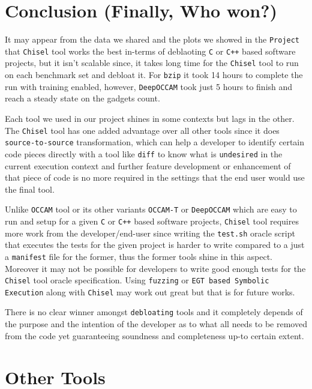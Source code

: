 \documentclass{relatorio}
\begin{document}
\section{Conclusion (Finally, Who won?)}%
\label{Tools}

It may appear from the data we shared and the plots we showed in the \texttt{Project} that \texttt{Chisel} tool works the best in-terms of deblaoting \texttt{C} or \texttt{C++} based software projects, but it isn't scalable since, it takes long time for the \texttt{Chisel} tool to run on each benchmark set and debloat it. For \texttt{bzip} it took 14 hours to complete the run with training enabled, however, \texttt{DeepOCCAM} took just 5 hours to finish and reach a steady state on the gadgets count.

Each tool we used in our project shines in some contexts but lags in the other. The \texttt{Chisel} tool has one added advantage over all other tools since it does \texttt{source-to-source} transformation, which can help a developer to identify certain code pieces directly with a tool like \texttt{diff} to know what is \texttt{undesired} in the current execution context and further feature development or enhancement of that piece of code is no more required in the settings that the end user would use the final tool.

Unlike \texttt{OCCAM} tool or its other variants \texttt{OCCAM-T} or \texttt{DeepOCCAM} which are easy to run and setup for a given \texttt{C} or \texttt{C++} based software projects, \texttt{Chisel} tool requires more work from the developer/end-user since writing the \texttt{test.sh} oracle script that executes the tests for the given project is harder to write compared to a just a \texttt{manifest} file for the former, thus the former tools shine in this aspect. Moreover it may not be possible for developers to write good enough tests for the \texttt{Chisel} tool oracle specification. Using \texttt{fuzzing} or \texttt{EGT based Symbolic Execution} along with \texttt{Chisel} may work out great but that is for future works. 

There is no clear winner amongst \texttt{debloating} tools and it completely depends of the purpose and the intention of the developer as to what all needs to be removed from the code yet guaranteeing soundness and completeness up-to certain extent.  

\section{Other Tools}%
\end{document}
